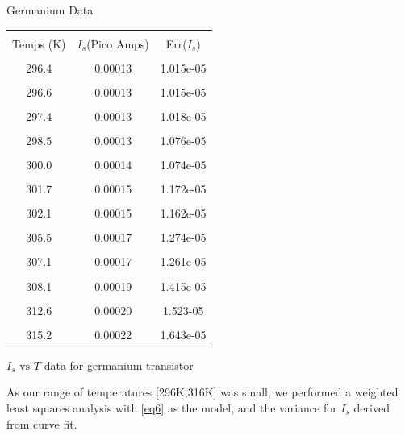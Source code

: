 \documentclass[12pt,letterpaper,twocolumn]{article}
\begin{document}
\begin {table}[H]
\caption*{Germanium Data}
{\footnotesize
\begin {center}
\begin {tabular} {|c | c | c| }
\hline&&\\
Temps (K) 			&    $I_s$(Pico Amps) & Err($I_s$)\\
\hline&&\\
296.4 & 0.00013 & 1.015e-05\\
\hline &&\\                
296.6 & 0.00013 & 1.015e-05\\
\hline &&\\                
297.4 & 0.00013 & 1.018e-05\\
\hline &&\\                
298.5 & 0.00013 & 1.076e-05\\
\hline &&\\                
300.0 & 0.00014 & 1.074e-05\\
\hline &&\\                
301.7 & 0.00015 & 1.172e-05\\
\hline &&\\                
302.1 & 0.00015 & 1.162e-05\\
\hline &&\\                
305.5 & 0.00017 & 1.274e-05\\
\hline &&\\                
307.1 & 0.00017 & 1.261e-05\\
\hline &&\\                
308.1 & 0.00019 & 1.415e-05\\
\hline &&\\                
312.6 & 0.00020 & 1.523-05 \\
\hline &&\\                
315.2 & 0.00022 & 1.643e-05\\
\hline%
\end {tabular}
\end {center}
\caption{\label{tab1} $I_s \text{ vs } T$ data for germanium transistor}
}
\end{table}

As our range of temperatures [296K,316K] was small, we performed a weighted least squares analysis with \ref{eq6} as the model, and the variance for $I_s$ derived from curve fit.
\end{document}
